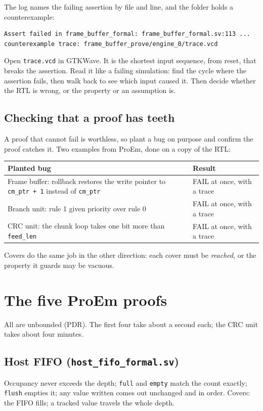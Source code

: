 \documentclass[11pt,a4paper]{article}
\newcommand{\file}[1]{\texttt{#1}}
\begin{document}
The log names the failing assertion by file and line, and the folder holds a counterexample:
\begin{lstlisting}
Assert failed in frame_buffer_formal: frame_buffer_formal.sv:113 ...
counterexample trace: frame_buffer_prove/engine_0/trace.vcd
\end{lstlisting}
Open \file{trace.vcd} in GTKWave. It is the shortest input sequence, from reset, that breaks the assertion. Read it like a failing simulation: find the cycle where the assertion fails, then walk back to see which input caused it. Then decide whether the RTL is wrong, or the property or an assumption is.

\subsection{Checking that a proof has teeth}

A proof that cannot fail is worthless, so plant a bug on purpose and confirm the proof catches it. Two examples from ProEm, done on a copy of the RTL:

\begin{center}
\begin{tabularx}{\linewidth}{@{}XX@{}}
\toprule
Planted bug & Result \\
\midrule
Frame buffer: rollback restores the write pointer to \texttt{cm\_ptr + 1} instead of \texttt{cm\_ptr} & FAIL at once, with a trace \\
Branch unit: rule 1 given priority over rule 0 & FAIL at once, with a trace \\
CRC unit: the chunk loop takes one bit more than \texttt{feed\_len} & FAIL at once, with a trace \\
\bottomrule
\end{tabularx}
\end{center}

Covers do the same job in the other direction: each cover must be \emph{reached}, or the property it guards may be vacuous.

\section{The five ProEm proofs}

All are unbounded (PDR). The first four take about a second each; the CRC unit takes about four minutes.

\subsection{Host FIFO (\file{host\_fifo\_formal.sv})}
Occupancy never exceeds the depth; \texttt{full} and \texttt{empty} match the count exactly; \texttt{flush} empties it; any value written comes out unchanged and in order. Covers: the FIFO fills; a tracked value travels the whole depth.
\end{document}

